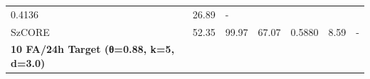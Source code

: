 \documentclass[
  10pt,
]{article}
\begin{document}
\begin{longtable}[]{@{}lllllll@{}}
\begin{minipage}[t]{0.12\columnwidth}
0.4136\strut
\end{minipage} & \begin{minipage}[t]{0.12\columnwidth}\raggedright
26.89\strut
\end{minipage} & \begin{minipage}[t]{0.12\columnwidth}\raggedright
-\strut
\end{minipage}\tabularnewline
\begin{minipage}[t]{0.12\columnwidth}\raggedright
SzCORE\strut
\end{minipage} & \begin{minipage}[t]{0.12\columnwidth}\raggedright
52.35\strut
\end{minipage} & \begin{minipage}[t]{0.12\columnwidth}\raggedright
99.97\strut
\end{minipage} & \begin{minipage}[t]{0.12\columnwidth}\raggedright
67.07\strut
\end{minipage} & \begin{minipage}[t]{0.12\columnwidth}\raggedright
0.5880\strut
\end{minipage} & \begin{minipage}[t]{0.12\columnwidth}\raggedright
8.59\strut
\end{minipage} & \begin{minipage}[t]{0.12\columnwidth}\raggedright
-\strut
\end{minipage}\tabularnewline
\begin{minipage}[t]{0.12\columnwidth}\raggedright
\textbf{10 FA/24h Target (θ=0.88, k=5, d=3.0)}\strut
\end{minipage} & \begin{minipage}[t]{0.12\columnwidth}\raggedright
\strut
\end{minipage} & \begin{minipage}[t]{0.12\columnwidth}\raggedright
\strut
\end{minipage} & \begin{minipage}[t]{0.12\columnwidth}\raggedright
\strut
\end{minipage} & \begin{minipage}[t]{0.12\columnwidth}\raggedright
\strut
\end{minipage} & \begin{minipage}[t]{0.12\columnwidth}\raggedright
\strut
\end{minipage} & \begin{minipage}[t]{0.12\columnwidth}\raggedright
\strut
\end{minipage}\tabularnewline

\end{longtable}
\end{document}
